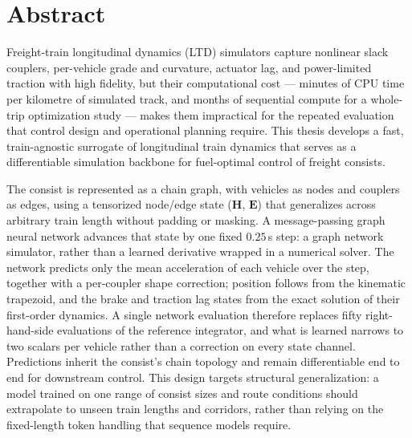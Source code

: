 \documentclass[12pt]{book}
\begin{document}

\begin{titlepage}
    \centering
    {\Large \thesisuniversity \par}
    \vspace{1cm}
    {\Large \thesisdepartment \par}
    \vspace{2cm}
    {\huge \bfseries \thesistitle \par}
    \vspace{2cm}
    {\Large \thesisauthor \par}
    \vspace{2cm}
    {\large \thesisdate \par}
\end{titlepage}

\chapter*{Abstract}

Freight-train longitudinal dynamics (LTD) simulators capture nonlinear slack couplers, per-vehicle grade and curvature, actuator lag, and power-limited traction with high fidelity, but their computational cost --- minutes of CPU time per kilometre of simulated track, and months of sequential compute for a whole-trip optimization study --- makes them impractical for the repeated evaluation that control design and operational planning require. This thesis develops a fast, train-agnostic surrogate of longitudinal train dynamics that serves as a differentiable simulation backbone for fuel-optimal control of freight consists.

The consist is represented as a chain graph, with vehicles as nodes and couplers as edges, using a tensorized node/edge state ($\mathbf{H}$, $\mathbf{E}$) that generalizes across arbitrary train length without padding or masking. A message-passing graph neural network advances that state by one fixed $0.25$\,s step: a graph network simulator, rather than a learned derivative wrapped in a numerical solver. The network predicts only the mean acceleration of each vehicle over the step, together with a per-coupler shape correction; position follows from the kinematic trapezoid, and the brake and traction lag states from the exact solution of their first-order dynamics. A single network evaluation therefore replaces fifty right-hand-side evaluations of the reference integrator, and what is learned narrows to two scalars per vehicle rather than a correction on every state channel. Predictions inherit the consist's chain topology and remain differentiable end to end for downstream control. This design targets structural generalization: a model trained on one range of consist sizes and route conditions should extrapolate to unseen train lengths and corridors, rather than relying on the fixed-length token handling that sequence models require.
\end{document}
